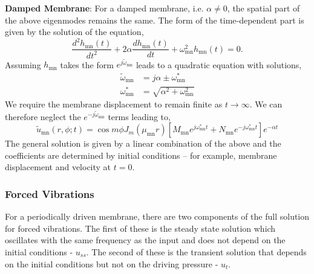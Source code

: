 \vspace{\baselineskip}
\noindent\textbf{Damped Membrane}: For a damped membrane, i.e. $\alpha\neq 0$, the spatial part of the above eigenmodes remains the same. The form of the
time-dependent part is given by the solution of the equation,
\begin{equation}\label{dampedtimepart}
 \frac{d^2 h_{\mathrm{mn}}(t)}{dt^2}+2\alpha \frac{d h_{\mathrm{mn}}(t)}{dt}+\omega_{\mathrm{mn}}^2h_{\mathrm{mn}}(t)=0.
\end{equation}
Assuming $h_{\mathrm{mn}}$ takes the form $e^{j\widetilde{\omega}_{\mathrm{mn}}}$ leads to a quadratic equation with solutions,
\begin{align}
 \widetilde{\omega}_{\mathrm{mn}}&=j\alpha\pm\omega_{\mathrm{mn}}^*\\
 \omega_{\mathrm{mn}}^*&=\sqrt{\alpha^2+\omega^2_{\mathrm{mn}}}
\end{align}
We require the membrane displacement to remain finite as $t\rightarrow\infty$. We can therefore neglect the $e^{-j\widetilde{\omega}_{\mathrm{mn}}}$ terms leading
to,
\begin{equation}\label{circularmembranedampedeigen}
 \widetilde{u}_{\mathrm{mn}}(r,\phi;t)=\cos m\phi J_m(\mu_{\mathrm{mn}} r)\left[M_{\mathrm{mn}}e^{j\omega_{\mathrm{mn}}^* t}+N_{\mathrm{mn}}e^{-j\omega_{\mathrm{mn}}^* t}\right]e^{-\alpha t}
\end{equation}
The general solution is given by a linear combination of the above and the coefficients are determined by initial conditions -- for example,
membrane displacement and velocity at $t=0$.
\subsubsection*{Forced Vibrations}
For a periodically driven membrane, there are two components of the full solution for forced vibrations. The first of these is the steady state solution which
oscillates with the same frequency as the input and does not depend on the initial conditions - $u_{ss}$. The second of these is the transient solution that depends
on the initial conditions but not on the driving pressure - $u_t$. 


